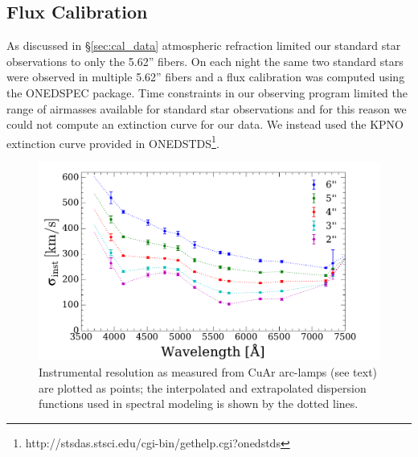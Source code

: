 \subsection{Flux Calibration}
\label{sec:flux_cal}


As discussed in \S\ref{sec:cal_data} atmospheric refraction limited
our standard star observations to only the 5.62'' fibers. On each
night the same two standard stars were observed in multiple 5.62''
fibers and a flux calibration was computed using the ONEDSPEC
package. Time constraints in our observing program limited the range
of airmasses available for standard star observations and for this
reason we could not compute an extinction curve for our data. We
instead used the KPNO extinction curve provided in
ONEDSTDS\footnote{http://stsdas.stsci.edu/cgi-bin/gethelp.cgi?onedstds}.

\begin{figure}
  \centering
  \includegraphics[width=\columnwidth]{891_1/figs/disp_paper.pdf}

  \caption{\label{fig:dispfunc}\fixspacing Instrumental resolution as
    measured from CuAr arc-lamps (see text) are plotted as points; the
    interpolated and extrapolated dispersion functions used in
    spectral modeling is shown by the dotted lines.}
\end{figure}

